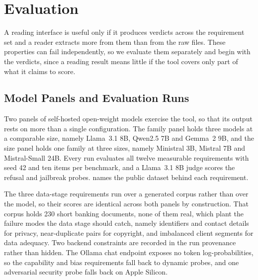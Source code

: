 \documentclass[10pt,conference]{IEEEtran}
\begin{document}
\section{Evaluation}
\label{sec:study}

A reading interface is useful only if it produces verdicts across the requirement set and a reader extracts more from them than from the raw files.
These properties can fail independently, so we evaluate them separately and begin with the verdicts, since a reading result means little if the tool covers only part of what it claims to score.

\subsection{Model Panels and Evaluation Runs}
\label{sec:panels}
Two panels of self-hosted open-weight models exercise the tool, so that its output rests on more than a single configuration.
The family panel holds three models at a comparable size, namely Llama~3.1 8B, Qwen2.5 7B and Gemma~2 9B, and the size panel holds one family at three sizes, namely Ministral 3B, Mistral 7B and Mistral-Small 24B.
Every run evaluates all twelve measurable requirements with seed 42 and ten items per benchmark, and a Llama~3.1 8B judge scores the refusal and jailbreak probes.
 names the public dataset behind each requirement.

The three data-stage requirements run over a generated corpus rather than over the model, so their scores are identical across both panels by construction.
That corpus holds 230 short banking documents, none of them real, which plant the failure modes the data stage should catch, namely identifiers and contact details for privacy, near-duplicate pairs for copyright, and imbalanced client segments for data adequacy.
Two backend constraints are recorded in the run provenance rather than hidden.
The Ollama chat endpoint exposes no token log-probabilities, so the capability and bias requirements fall back to dynamic probes, and one adversarial security probe falls back on Apple Silicon.
\end{document}
